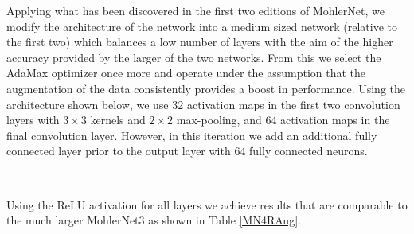 \documentclass[12pt]{article}
\begin{document}
Applying what has been discovered in the first two editions of MohlerNet, we modify the architecture of the network into a medium sized network (relative to the first two) which balances a low number of layers with the aim of the higher accuracy provided by the larger of the two networks. From this we select the AdaMax optimizer once more and operate under the assumption that the augmentation of the data consistently provides a boost in performance. Using the architecture shown below, we use 32 activation maps in the first two convolution layers with $3\times3$ kernels and $2\times2$ max-pooling, and 64 activation maps in the final convolution layer. However, in this iteration we add an additional fully connected layer prior to the output layer with 64 fully connected neurons.
\begin{center}
	 \\
\end{center} 
Using the ReLU activation for all layers we achieve results that are comparable to the much larger MohlerNet3 as shown in Table \ref{MN4RAug}.
\end{document}
